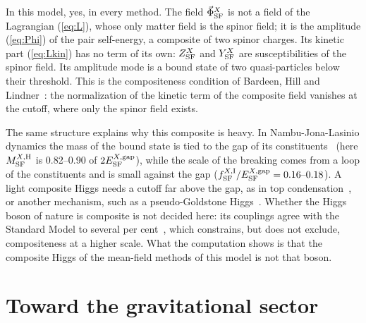 \documentclass[aps,prd,twocolumn,superscriptaddress,nofootinbib,floatfix,longbibliography]{revtex4-2}
\newcommand{\SF}{{\rm SF}}
\begin{document}
In this model, yes, in every method. The field $\vec\Phi^X_\SF$ is not a field of the Lagrangian (\ref{eq:L}), whose only
matter field is the spinor field; it is the amplitude (\ref{eq:Phi}) of the pair self-energy, a composite of two spinor
charges. Its kinetic part (\ref{eq:Lkin}) has no term of its own: $Z^X_\SF$ and $Y^X_\SF$ are susceptibilities of the spinor
field. Its amplitude mode is a bound state of two quasi-particles below their threshold. This is the compositeness
condition of Bardeen, Hill and Lindner~\cite{BHL1990}: the normalization of the kinetic term of the composite field vanishes
at the cutoff, where only the spinor field exists.

The same structure explains why this composite is heavy. In Nambu-Jona-Lasinio dynamics the mass of the bound state is
tied to the gap of its constituents~\cite{NJL1961} (here $M^{X,{\rm H}}_\SF$ is 0.82\mbox{--}0.90 of $2E^{X,{\rm gap}}_\SF$), while
the scale of the breaking comes from a loop of the constituents and is small against the gap
($f^{X,{\rm I}}_\SF/E^{X,{\rm gap}}_\SF=0.16\mbox{--}0.18$). A light composite Higgs needs a cutoff far above the gap, as in top
condensation~\cite{BHL1990,HillSimmons2003}, or another mechanism, such as a pseudo-Goldstone Higgs~\cite{KaplanGeorgi1984,Agashe2005}.
Whether the Higgs boson of nature is composite is not decided here: its couplings agree with the Standard Model to several
per cent~\cite{ATLAS2022,CMS2022}, which constrains, but does not exclude, compositeness at a higher scale. What the
computation shows is that the composite Higgs of the mean-field methods of this model is not that boson.

\section{Toward the gravitational sector}
\label{sec:gravity}
\end{document}
